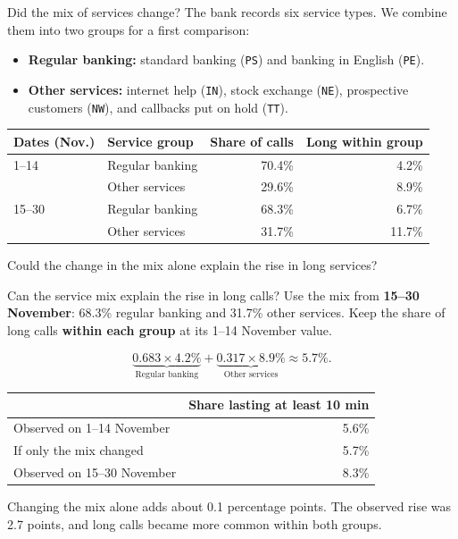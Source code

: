 \documentclass{beamer}
\begin{document}
\begin{frame}{Did the mix of services change?}
  \small
  The bank records six service types. We combine them into two groups
  for a first comparison:

  \begin{itemize}
    \item \textbf{Regular banking:} standard banking (\texttt{PS}) and banking
      in English (\texttt{PE}).
    \item \textbf{Other services:} internet help (\texttt{IN}), stock exchange
      (\texttt{NE}), prospective customers (\texttt{NW}), and callbacks put
      on hold (\texttt{TT}).
  \end{itemize}

  \vspace{0.25em}
  \centering
  \begin{tabular}{@{}llrr@{}}
    \toprule
    Dates (Nov.) & Service group & Share of calls & Long within group\\
    \midrule
    1--14 & Regular banking & 70.4\% & 4.2\%\\
          & Other services  & 29.6\% & 8.9\%\\[0.2em]
    15--30 & Regular banking & 68.3\% & 6.7\%\\
           & Other services  & 31.7\% & 11.7\%\\
    \bottomrule
  \end{tabular}

  \vspace{0.55em}
  \raggedright
  Could the change in the mix alone explain the rise in long services?
\end{frame}

\begin{frame}{Can the service mix explain the rise in long calls?}
  \small
  Use the mix from \textbf{15--30 November}: 68.3\% regular banking
  and 31.7\% other services. Keep the share of long calls \textbf{within
  each group} at its 1--14 November value.

  \[
    \underbrace{0.683 \times 4.2\%}_{\text{Regular banking}}
    + \underbrace{0.317 \times 8.9\%}_{\text{Other services}}
    \approx 5.7\%.
  \]

  \vspace{0.15em}
  \centering
  \begin{tabular}{@{}lr@{}}
    \toprule
    & Share lasting at least 10 min\\
    \midrule
    Observed on 1--14 November & 5.6\%\\
    If only the mix changed    & 5.7\%\\
    Observed on 15--30 November & 8.3\%\\
    \bottomrule
  \end{tabular}

  \vspace{0.65em}
  \raggedright
  Changing the mix alone adds about 0.1 percentage points. The observed
  rise was 2.7 points, and long calls became more common within both groups.
\end{frame}
\end{document}
